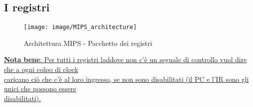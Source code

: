 \documentclass[../main.tex]{subfiles}
\begin{document}
    \subsection{I registri}

    \begin{figure}[h!]
        \centering

        \vspace*{5mm}
        \texttt{[image: image/MIPS\_architecture]}
        \newline
        \caption{Architettura MIPS - Pacchetto dei registri}
        \vspace*{5mm}
    \end{figure}

    \noindent
    \underline{\textbf{Nota bene}: Per tutti i registri laddove non c'è un
    segnale di controllo vuol dire che a ogni colpo di clock} \\
    \underline{caricano ciò che c'è al loro ingresso, se non sono
    disabilitati (il PC e l'IR sono gli unici che possono essere} \\
    \underline{disabilitati).}

    \newpage
\end{document}
